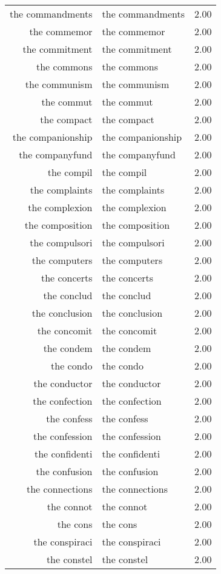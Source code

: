 \begin{table}[ht]
\begin{tabular}{rlr}
  the commandments & the commandments & 2.00 \\ 
  the commemor & the commemor & 2.00 \\ 
  the commitment & the commitment & 2.00 \\ 
  the commons & the commons & 2.00 \\ 
  the communism & the communism & 2.00 \\ 
  the commut & the commut & 2.00 \\ 
  the compact & the compact & 2.00 \\ 
  the companionship & the companionship & 2.00 \\ 
  the companyfund & the companyfund & 2.00 \\ 
  the compil & the compil & 2.00 \\ 
  the complaints & the complaints & 2.00 \\ 
  the complexion & the complexion & 2.00 \\ 
  the composition & the composition & 2.00 \\ 
  the compulsori & the compulsori & 2.00 \\ 
  the computers & the computers & 2.00 \\ 
  the concerts & the concerts & 2.00 \\ 
  the conclud & the conclud & 2.00 \\ 
  the conclusion & the conclusion & 2.00 \\ 
  the concomit & the concomit & 2.00 \\ 
  the condem & the condem & 2.00 \\ 
  the condo & the condo & 2.00 \\ 
  the conductor & the conductor & 2.00 \\ 
  the confection & the confection & 2.00 \\ 
  the confess & the confess & 2.00 \\ 
  the confession & the confession & 2.00 \\ 
  the confidenti & the confidenti & 2.00 \\ 
  the confusion & the confusion & 2.00 \\ 
  the connections & the connections & 2.00 \\ 
  the connot & the connot & 2.00 \\ 
  the cons & the cons & 2.00 \\ 
  the conspiraci & the conspiraci & 2.00 \\ 
  the constel & the constel & 2.00 \\ 

\end{tabular}
\end{table}
